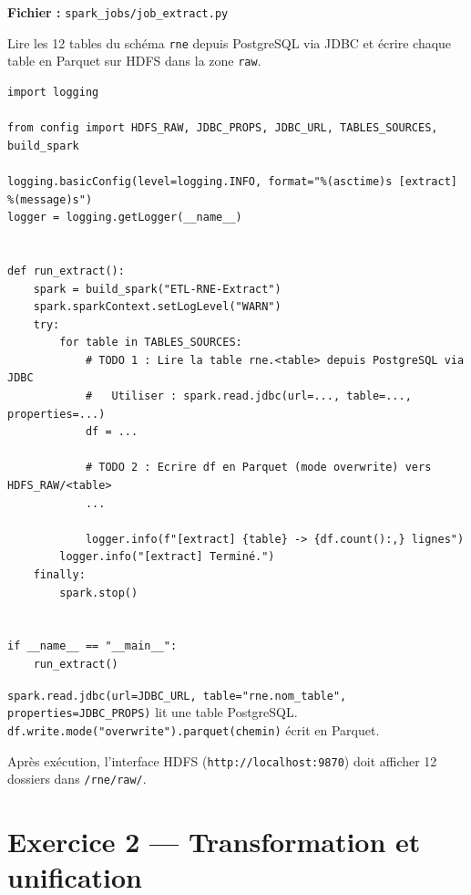 \documentclass[11pt,a4paper]{article}
\begin{document}
\textbf{Fichier :} \texttt{spark\_jobs/job\_extract.py}

\begin{objectif}
Lire les 12 tables du schéma \texttt{rne} depuis PostgreSQL via JDBC et écrire chaque table en Parquet sur HDFS dans la zone \texttt{raw}.
\end{objectif}

\begin{lstlisting}
import logging

from config import HDFS_RAW, JDBC_PROPS, JDBC_URL, TABLES_SOURCES, build_spark

logging.basicConfig(level=logging.INFO, format="%(asctime)s [extract] %(message)s")
logger = logging.getLogger(__name__)


def run_extract():
    spark = build_spark("ETL-RNE-Extract")
    spark.sparkContext.setLogLevel("WARN")
    try:
        for table in TABLES_SOURCES:
            # TODO 1 : Lire la table rne.<table> depuis PostgreSQL via JDBC
            #   Utiliser : spark.read.jdbc(url=..., table=..., properties=...)
            df = ...

            # TODO 2 : Ecrire df en Parquet (mode overwrite) vers HDFS_RAW/<table>
            ...

            logger.info(f"[extract] {table} -> {df.count():,} lignes")
        logger.info("[extract] Terminé.")
    finally:
        spark.stop()


if __name__ == "__main__":
    run_extract()
\end{lstlisting}

\begin{hint}
\texttt{spark.read.jdbc(url=JDBC\_URL, table="rne.nom\_table", properties=JDBC\_PROPS)} lit une table PostgreSQL.\\
\texttt{df.write.mode("overwrite").parquet(chemin)} écrit en Parquet.
\end{hint}

\begin{validation}
Après exécution, l'interface HDFS (\texttt{http://localhost:9870}) doit afficher 12 dossiers dans \texttt{/rne/raw/}.
\end{validation}

\section{Exercice 2 — Transformation et unification}
\end{document}
